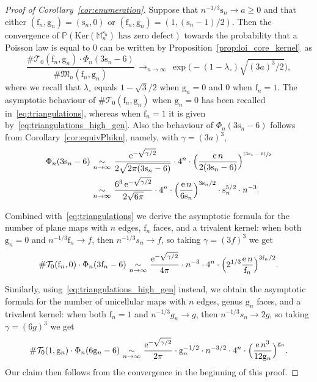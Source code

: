 \documentclass[11pt]{article}
\newcommand{\psfrac}[2]{\sfrac{(#1)}{#2}}
\theoremstyle{plain}
\theoremstyle{definition}
\theoremstyle{remark}
\newcommand{\e}{\operatorname{e}}
\newcommand{\Mapb}{\mathbb{M}}
\newcommand{\face}{\mathrm{f}}
\newcommand{\gen}{\mathrm{g}}
\newcommand{\spar}{\mathrm{s}}
\newcommand{\cv}[1][n]{\,\mathop{\longrightarrow}^{}_{#1 \to \infty}\,}
\newcommand{\equi}[1][n]{\,\mathop{\sim}^{}_{#1 \to \infty}\,}
\begin{document}
\begin{proof}[Proof of Corollary~\ref{cor:enumeration}]
Suppose that $n^{-1/3} \spar_n \!\to\! a \!\ge\! 0$ and that either $(\face_n, \gen_n) \!=\! (\spar_n, 0)$ or $(\face_n, \gen_n) \!=\! (1, (\spar_n-1)/2)$. Then the convergence of $\mathbb{P}(\mathrm{Ker}(\Mapb_{n}^{\spar_{n}}) \mbox{ has zero defect})$ towards the probability that a Poisson law is equal to $0$ can be written by Proposition~\ref{prop:loi_core_kernel}~as
\[
\frac{\# \mathcal{T}_0(\face_n,\gen_n) \cdot \Phi_{n}(3\spar_n-6 )}{\# \mathfrak{M}_n(\face_n,\gen_n)}
\cv \exp\bigl(- (1-\lambda_{\circ}) \sqrt{(3a)^3 / 2}\bigr),
\]
where we recall that $\lambda_\circ$ equals $1 - \sqrt{3}/2$ when $\gen_n=0$ and $0$ when $\face_n=1$.
The asymptotic behaviour of $\# \mathcal{T}_0(\face_n,\gen_n)$ when $\gen_n=0$ has been recalled in~\eqref{eq:triangulations}, whereas when $\face_n=1$ it is given by~\eqref{eq:triangulations_high_gen}. Also the behaviour of $\Phi_{n}(3\spar_n-6 )$ follows from Corollary~\ref{cor:equivPhikn}, namely, with $\gamma = (3a)^3$,\vspace*{-3pt}
\begin{align*}
\Phi_{n}(3 \spar_{n}-6)
& \equi \frac{\e^{- \sqrt{\gamma/2}}}{2\sqrt{2 \pi (3\spar_{n}-6)}} \cdot 4^{n} \cdot \Bigl(\frac{\e n}{2 (3\spar_{n}-6)}\Bigr)^{ \psfrac{3\spar_{n}-6}{2}}
\\
& \equi \frac{6^3 \e^{- \sqrt{\gamma/2}}}{2\sqrt{6 \pi}} \cdot 4^{n} \cdot \Bigl(\frac{\e n}{6 \spar_{n}}\Bigr)^{3\spar_{n}/2} \cdot \spar_{n}^{5/2} \cdot n^{-3}.
\end{align*}

Combined with~\eqref{eq:triangulations} we derive the asymptotic formula for the number of plane maps with $n$ edges, $\face_n$ faces, and a trivalent kernel: when both $\gen_n=0$ and $n^{-1/3} \face_n \to f$, then $n^{-1/3} s_{n} \rightarrow f$, so taking $\gamma=(3f)^{3}$ we get
\[
\#\mathcal{T}_0(\face_n,0) \cdot \Phi_{n}(3 \face_{n}-6)
\equi \frac{\e^{- \sqrt{\gamma/2}}}{4 \pi} \cdot n^{-3} \cdot 4^{n} \cdot \Bigl(2^{1/3} \frac{\e n}{\face_{n}}\Bigr)^{3\face_{n}/2}.
\]

Similarly, using~\eqref{eq:triangulations_high_gen} instead, we obtain the asymptotic formula for the number of unicellular maps with $n$ edges, genus $\gen_n$ faces, and a trivalent kernel: when both $\face_n=1$ and $n^{-1/3} g_{n} \rightarrow g$, then $n^{-1/3} s_{n} \rightarrow 2g$, so taking $\gamma=(6g)^{3}$ we get
\[
\#\mathcal{T}_0(1,\gen_n) \cdot \Phi_{n}(6 \gen_{n}-6)
\equi \frac{ \e^{- \sqrt{\gamma/2}}}{2\pi } \cdot \gen_n^{-1/2} \cdot n^{-3/2} \cdot 4^{n} \cdot \Bigl(\frac{\e n^3}{12 \gen_n}\Bigr)^{\gen_n}.
\]
Our claim then follows from the convergence in the beginning of this proof.
\end{proof}
\end{document}
